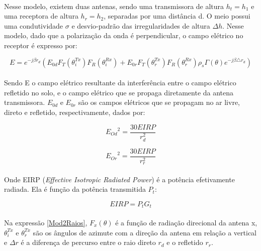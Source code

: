 \paragraph{}Nesse modelo, existem duas antenas, sendo uma transmissora de altura $h_t = h_1$ e uma receptora de altura $h_r = h_2$, separadas por uma distância d. O meio possui uma condutividade $\sigma$ e desvio-padrão das irregularidades de altura $\Delta h$. Nesse modelo, dado que a polarização da onda é perpendicular, o campo elétrico no receptor é expresso por:

\begin{equation}
\label{Mod2Raios}
    E = e^{-j\beta r_d}(E_{0d}F_{T}(\theta_i^{Tx})F_{R}(\theta_i^{Rx})+E_{0r}F_{T}(\theta_r^{Tx})F_{R}(\theta_r^{Rx})\rho_s\Gamma(\theta)e^{-j\beta\triangle r_d})
\end{equation}

\paragraph{}Sendo E o campo elétrico resultante da interferência entre o campo elétrico refletido no solo, e o campo elétrico que se propaga diretamente da antena transmissora. $E_{0d}$ e $E_{0r}$ são os campos elétricos que se propagam no ar livre, direto e refletido, respectivamente, dados por:

\begin{equation}
    {E_{Od}}^2 = \frac{30EIRP}{r_d^2}
\end{equation}

\begin{equation}
    {E_{Or}}^2 = \frac{30EIRP}{r_r^2}
\end{equation}

\paragraph{}Onde EIRP (\textit{Effective Isotropic Radiated Power}) é a potência efetivamente radiada. Ela é função da potência transmitida $P_t$:

\begin{equation}
    EIRP = P_tG_t
\end{equation}


\paragraph{}Na expressão \ref{Mod2Raios}, $F_x(\theta)$ é a função de radiação direcional da antena x, $\theta_i^{Tx}$ e $\theta_r^{Tx}$ são os ângulos de azimute com a direção da antena em relação a vertical e $\Delta r$ é a diferença de percurso entre o raio direto $r_d$ e o refletido $r_r$. 



